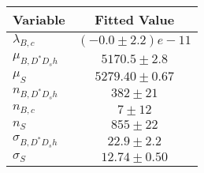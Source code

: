 \begin{tabular}[t]{lc}
\hline
Variable &Fitted Value\\
\hline\hline
$\lambda_{B,c}$&$(-0.0\pm2.2)e-11$\\
\hline
$\mu_{B, D^* D_s h}$&$5170.5\pm2.8$\\
\hline
$\mu_S$&$5279.40\pm0.67$\\
\hline
$n_{B, D^* D_s h}$&$382\pm21$\\
\hline
$n_{B,c}$&$7\pm12$\\
\hline
$n_S$&$855\pm22$\\
\hline
$\sigma_{B, D^* D_s h}$&$22.9\pm2.2$\\
\hline
$\sigma_S$&$12.74\pm0.50$\\
\hline
\end{tabular}